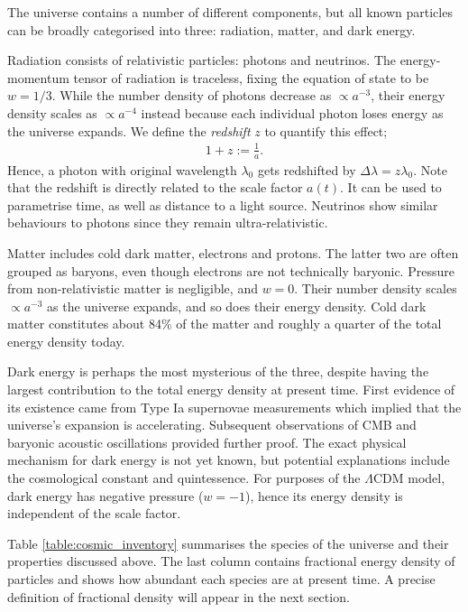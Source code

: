 The universe contains a number of different components, but all known particles can be broadly categorised into three: radiation, matter, and dark energy.

Radiation consists of relativistic particles: photons and neutrinos. The energy-momentum tensor of radiation is traceless, fixing the equation of state to be $w=1/3$. While the number density of photons decrease as $\propto a^{-3}$, their energy density scales as $\propto a^{-4}$ instead because each individual photon loses energy as the universe expands. We define the \textit{redshift} $z$ to quantify this effect;
\begin{align}
	1 + z := \frac{1}{a}.	\label{def:redshift}
\end{align}
Hence, a photon with original wavelength $\lambda_0$ gets redshifted by $\Delta\lambda = z \lambda_0$. Note that the redshift is directly related to the scale factor $a(t)$. It can be used to parametrise time, as well as distance to a light source. Neutrinos show similar behaviours to photons since they remain ultra-relativistic.

Matter includes cold dark matter, electrons and protons. The latter two are often grouped as baryons, even though electrons are not technically baryonic. Pressure from non-relativistic matter is negligible, and $w = 0$. Their number density scales $\propto a^{-3}$ as the universe expands, and so does their energy density. Cold dark matter constitutes about 84\% of the matter and roughly a quarter of the total energy density today.

Dark energy is perhaps the most mysterious of the three, despite having the largest contribution to the total energy density at present time. First evidence of its existence came from Type Ia supernovae measurements which implied that the universe's expansion is accelerating. Subsequent observations of CMB and baryonic acoustic oscillations provided further proof. The exact physical mechanism for dark energy is not yet known, but potential explanations include the cosmological constant and quintessence. For purposes of the $\Lambda$CDM model, dark energy has negative pressure ($w=-1$), hence its energy density is independent of the scale factor.

Table \ref{table:cosmic_inventory} summarises the species of the universe and their properties discussed above. The last column contains fractional energy density of particles and shows how abundant each species are at present time. A precise definition of fractional density will appear in the next section.

